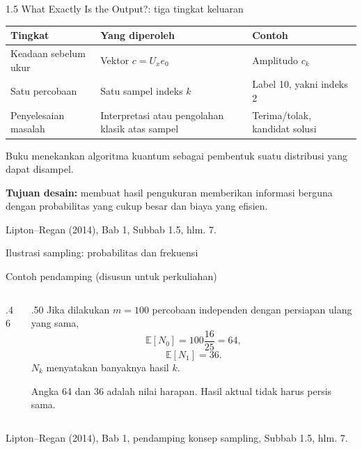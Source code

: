 \documentclass[aspectratio=169,11pt]{beamer}
\newcommand{\bookref}[1]{\par\vfill{\scriptsize\color{gray}Lipton--Regan (2014), Bab 1, #1.}}
\newcommand{\extra}{\par\textcolor{AcademicBlue}{\small Contoh pendamping (disusun untuk perkuliahan)}\par}
\begin{document}
\begin{frame}{1.5 What Exactly Is the Output?: tiga tingkat keluaran}

\begin{center}
\begin{tabular}{p{3.2cm}p{4.4cm}p{4.1cm}}\toprule
Tingkat & Yang diperoleh & Contoh\\\midrule
Keadaan sebelum ukur & Vektor $c=U_xe_0$ & Amplitudo $c_k$\\[2mm]
Satu percobaan & Satu sampel indeks $k$ & Label 10, yakni indeks 2\\[2mm]
Penyelesaian masalah & Interpretasi atau pengolahan klasik atas sampel & Terima/tolak, kandidat solusi\\\bottomrule
\end{tabular}
\end{center}
\par\medskip
Buku menekankan algoritma kuantum sebagai pembentuk suatu distribusi yang dapat disampel.
\par\medskip
\textbf{Tujuan desain:} membuat hasil pengukuran memberikan informasi berguna dengan probabilitas yang cukup besar dan biaya yang efisien.
\bookref{Subbab 1.5, hlm. 7}

\end{frame}

\begin{frame}{Ilustrasi sampling: probabilitas dan frekuensi}

\extra
\begin{columns}[c]
\begin{column}{.46\textwidth}
\centering
{}
\end{column}
\begin{column}{.50\textwidth}
Jika dilakukan $m=100$ percobaan independen dengan persiapan ulang yang sama,
\[
 \mathbb E[N_0]=100\frac{16}{25}=64,
\]
\[
 \mathbb E[N_1]=36.
\]
$N_k$ menyatakan banyaknya hasil $k$.
\par\medskip
Angka 64 dan 36 adalah nilai harapan. Hasil aktual tidak harus persis sama.
\end{column}
\end{columns}
\bookref{pendamping konsep sampling, Subbab 1.5, hlm. 7}

\end{frame}
\end{document}
